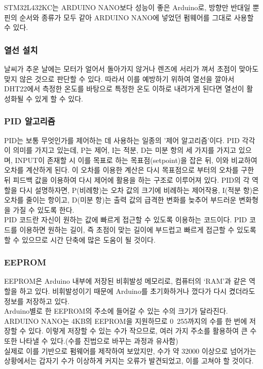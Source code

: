 STM32L432KC는 ARDUINO NANO보다 성능이 좋은 Arduino로, 방향만 반대일 뿐 핀의 순서와 종류가 모두 같아 ARDUINO NANO에 넣었던 펌웨어를 그대로 사용할 수 있다.

\subsubsection{열선 설치}

날씨가 추운 날에는 모터가 얼어서 돌아가지 않거나 렌즈에 서리가 껴서 초점이 맞아도 맞지 않은 것으로 판단할 수 있다. 따라서 이를 예방하기 위하여 열선을 깔아서 DHT22에서 측정한 온도를 바탕으로 특정한 온도 이하로 내려가게 된다면 열선이 활성화될 수 있게 할 수 있다.

\subsubsection{PID 알고리즘}

PID는 보통 무엇인가를 제어하는 데 사용하는 일종의 ’제어 알고리즘’이다. PID 각각이 의미를 가지고 있는데, P는 제어, I는 적분, D는 미분 항의 세 가지를 가지고 있으며, INPUT이 존재할 시 이를 목표로 하는 목표점(setpoint)을 잡은 뒤, 이와 비교하여 오차를 계산하게 된다. 이 오차를 이용한 계산은 다시 목표점으로 부터의 오차를 구한 뒤 피드백 값을 이용하여 다시 제어에 활용을 하는 구조로 이루어져 있다.
PID의 각 역할을 다시 설명하자면, P(비례항)는 오차 값의 크기에 비례하는 제어작용, I(적분 항)은 오차를 줄이는 항이고, D(미분 항)는 출력 값의 급격한 변화를 늦추어 부드러운 변화형을 가질 수 있도록 한다.\\
PID 코드란 자신이 원하는 값에 빠르게 접근할 수 있도록 이용하는 코드이다. PID 코드를 이용하면 원하는 길이, 즉 초점이 맞는 길이에 부드럽고 빠르게 접근할 수 있도록 할 수 있으므로 시간 단축에 많은 도움이 될 것이다.

\subsubsection{EEPROM}

EEPROM은 Arduino 내부에 저장된 비휘발성 메모리로, 컴퓨터의 ‘RAM’과 같은 역할을 하고 있다. 비휘발성이기 때문에 Arduino를 초기화하거나 껐다가 다시 켰더라도 정보를 저장하고 있다.\\
Arduino별로 한 EEPROM의 주소에 들어갈 수 있는 수의 크기가 달라진다. ARDUINO NANO는 4KB의 EEPROM을 지원하므로 0~255까지의 수를 한 번에 저장할 수 있다. 이렇게 저장할 수 있는 수가 작으므로, 여러 가지 주소를 활용하여 큰 수 또한 나타낼 수 있다.(수를 진법으로 바꾸는 과정과 유사함)\\
실제로 이를 기반으로 펌웨어를 제작하여 보았지만, 수가 약 32000 이상으로 넘어가는 상황에서는 갑자기 수가 이상하게 커지는 오류가 발견되었고, 이를 고쳐야 할 것이다.

